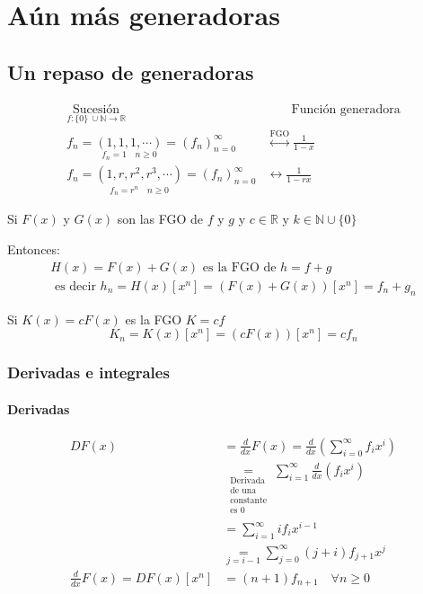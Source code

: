 \documentclass[../main.tex]{subfiles}
\begin{document}
\chapter{Aún más generadoras}%

\thispagestyle{fancy}

\section{Un repaso de generadoras}%
\label{sec:un_repaso_de_generadoras}

\begin{align*}
	\underset
	{
		f:\{0\}\ \cup \mathbb{N} \longrightarrow \mathbb{R}
	}
	{
		\text{Sucesión}
	}
	&\quad
	\quad
	\text{Función generadora}\\
	f_n =
	\underset
	{
		f_n=1 \quad n \geq 0
	}
	{
		(1,1,1,\cdots)
	}
	= (f_n)^\infty_{n=0}
	&\overset
	{
		\text{FGO}
	}
	{
		\longleftrightarrow
	}
	\frac{1}{1-x}\\
	f_n =
	\underset
	{
		f_n = r^n \quad n \geq 0
	}
	{
		(1,r,r^2,r^3,\cdots)
	}
	= (f_n)^\infty_{n=0}
	&\longleftrightarrow
	\frac{1}{1-rx}
\end{align*}

Si $F(x)$ y $G(x)$ son las FGO de $f$ y $g$ y $c\in\mathbb{R}$ y
$k\in\mathbb{N}\cup\{0\}$

Entonces:
\begin{gather*}
	H(x)=F(x)+G(x)\text{ es la FGO de } h=f+g\\
	\text{ es decir }
	h_n = H(x)[x^n]=
	\left(
		F(x)+G(x)
	\right)
	[x^n] = f_n+g_n
\end{gather*}

Si $K(x)=cF(x)$ es la FGO $K=cf$
\[
	K_n=K(x)[x^n]=(cF(x))[x^n]=cf_n
\]

\subsection{Derivadas e integrales}%
\label{sub:derivadas_e_integrales}

\subsubsection{Derivadas}%
\label{subsub:derivadas}


\begin{align*}
	DF(x) &= \frac{d}{dx} F(x)
	= \frac{d}{dx}
	\left(
		\sum_{i=0}^\infty f_ix^i
	\right)\\
	&
	\underset
	{
		\substack
		{
			\text{Derivada}\\
			\text{de una}\\
			\text{constante}\\
			\text{es $0$}
		}
	}
	{
		=
	}
	\sum_{i=1}^\infty \frac{d}{dx} (f_ix^i)\\
	&= \sum_{i=1}^\infty if_ix^{i-1}\\
	&
	\underset
	{
		j=i-1
	}
	{
		=
	}
	\sum_{j=0}^\infty
	(j+i)f_{j+1}x^j\\
	\frac{d}{dx} F(x) = DF(x)[x^n]
	&=(n+1)f_{n+1}\quad \forall n \geq 0
\end{align*}
\end{document}
